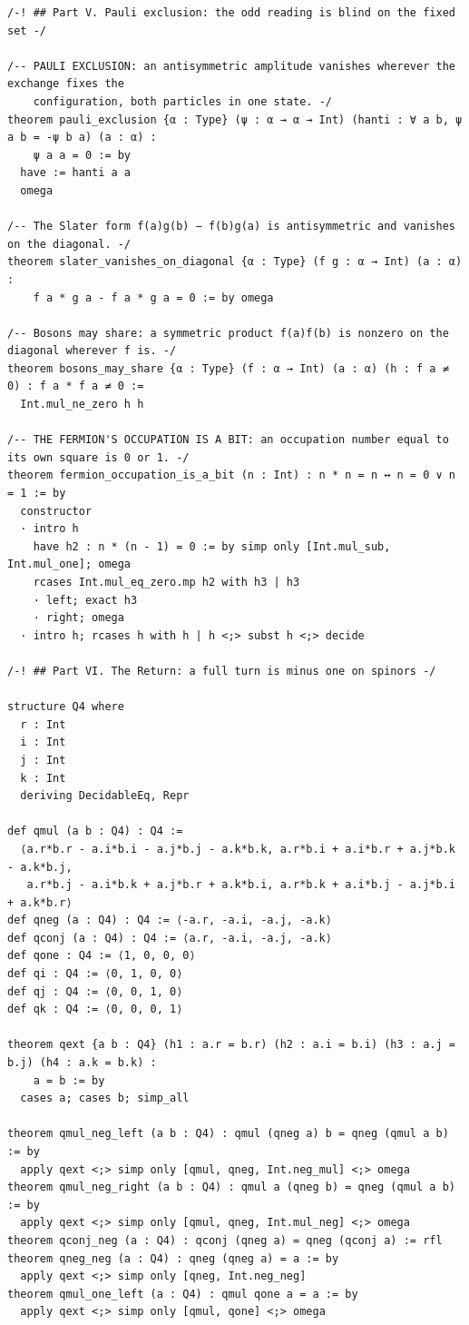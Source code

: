 \documentclass[10pt]{article}
\begin{document}
\begin{multicols}{2}
\begin{Verbatim}[fontsize=\fontsize{6.0}{6.9}\selectfont,breaklines,breakanywhere,breaksymbolleft={}]
/-! ## Part V. Pauli exclusion: the odd reading is blind on the fixed set -/

/-- PAULI EXCLUSION: an antisymmetric amplitude vanishes wherever the exchange fixes the
    configuration, both particles in one state. -/
theorem pauli_exclusion {α : Type} (ψ : α → α → Int) (hanti : ∀ a b, ψ a b = -ψ b a) (a : α) :
    ψ a a = 0 := by
  have := hanti a a
  omega

/-- The Slater form f(a)g(b) − f(b)g(a) is antisymmetric and vanishes on the diagonal. -/
theorem slater_vanishes_on_diagonal {α : Type} (f g : α → Int) (a : α) :
    f a * g a - f a * g a = 0 := by omega

/-- Bosons may share: a symmetric product f(a)f(b) is nonzero on the diagonal wherever f is. -/
theorem bosons_may_share {α : Type} (f : α → Int) (a : α) (h : f a ≠ 0) : f a * f a ≠ 0 :=
  Int.mul_ne_zero h h

/-- THE FERMION'S OCCUPATION IS A BIT: an occupation number equal to its own square is 0 or 1. -/
theorem fermion_occupation_is_a_bit (n : Int) : n * n = n ↔ n = 0 ∨ n = 1 := by
  constructor
  · intro h
    have h2 : n * (n - 1) = 0 := by simp only [Int.mul_sub, Int.mul_one]; omega
    rcases Int.mul_eq_zero.mp h2 with h3 | h3
    · left; exact h3
    · right; omega
  · intro h; rcases h with h | h <;> subst h <;> decide

/-! ## Part VI. The Return: a full turn is minus one on spinors -/

structure Q4 where
  r : Int
  i : Int
  j : Int
  k : Int
  deriving DecidableEq, Repr

def qmul (a b : Q4) : Q4 :=
  ⟨a.r*b.r - a.i*b.i - a.j*b.j - a.k*b.k, a.r*b.i + a.i*b.r + a.j*b.k - a.k*b.j,
   a.r*b.j - a.i*b.k + a.j*b.r + a.k*b.i, a.r*b.k + a.i*b.j - a.j*b.i + a.k*b.r⟩
def qneg (a : Q4) : Q4 := ⟨-a.r, -a.i, -a.j, -a.k⟩
def qconj (a : Q4) : Q4 := ⟨a.r, -a.i, -a.j, -a.k⟩
def qone : Q4 := ⟨1, 0, 0, 0⟩
def qi : Q4 := ⟨0, 1, 0, 0⟩
def qj : Q4 := ⟨0, 0, 1, 0⟩
def qk : Q4 := ⟨0, 0, 0, 1⟩

theorem qext {a b : Q4} (h1 : a.r = b.r) (h2 : a.i = b.i) (h3 : a.j = b.j) (h4 : a.k = b.k) :
    a = b := by
  cases a; cases b; simp_all

theorem qmul_neg_left (a b : Q4) : qmul (qneg a) b = qneg (qmul a b) := by
  apply qext <;> simp only [qmul, qneg, Int.neg_mul] <;> omega
theorem qmul_neg_right (a b : Q4) : qmul a (qneg b) = qneg (qmul a b) := by
  apply qext <;> simp only [qmul, qneg, Int.mul_neg] <;> omega
theorem qconj_neg (a : Q4) : qconj (qneg a) = qneg (qconj a) := rfl
theorem qneg_neg (a : Q4) : qneg (qneg a) = a := by
  apply qext <;> simp only [qneg, Int.neg_neg]
theorem qmul_one_left (a : Q4) : qmul qone a = a := by
  apply qext <;> simp only [qmul, qone] <;> omega


\end{Verbatim}
\end{multicols}
\end{document}
